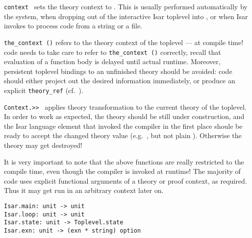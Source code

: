 \begin{isabellebody}
\begin{isamarkuptext}
  \begin{description}

  \item \verb|context|~ sets the {\ML} theory context to
  .  This is usually performed automatically by the system,
  when dropping out of the interactive Isar toplevel into {\ML}, or
  when Isar invokes {\ML} to process code from a string or a file.

  \item \verb|the_context ()| refers to the theory context of the
  {\ML} toplevel --- at compile time!  {\ML} code needs to take care
  to refer to \verb|the_context ()| correctly, recall that evaluation
  of a function body is delayed until actual runtime.  Moreover,
  persistent {\ML} toplevel bindings to an unfinished theory should be
  avoided: code should either project out the desired information
  immediately, or produce an explicit \verb|theory_ref| (cf.\
  ).

  \item \verb|Context.>>|~ applies theory transformation
  \isa{f} to the current theory of the {\ML} toplevel.  In order to
  work as expected, the theory should be still under construction, and
  the Isar language element that invoked the {\ML} compiler in the
  first place shoule be ready to accept the changed theory value
  (e.g.\ \isakeyword{ML-setup}, but not plain \isakeyword{ML}).
  Otherwise the theory may get destroyed!

  \end{description}

  It is very important to note that the above functions are really
  restricted to the compile time, even though the {\ML} compiler is
  invoked at runtime!  The majority of {\ML} code uses explicit
  functional arguments of a theory or proof context, as required.
  Thus it may get run in an arbitrary context later on.

  \bigskip

  \begin{mldecls}
  \verb|Isar.main: unit -> unit| \\
  \verb|Isar.loop: unit -> unit| \\
  \verb|Isar.state: unit -> Toplevel.state| \\
  \indexml{Isar.exn}\verb|Isar.exn: unit -> (exn * string) option| \\
  \end{mldecls}


\end{isamarkuptext}
\end{isabellebody}
